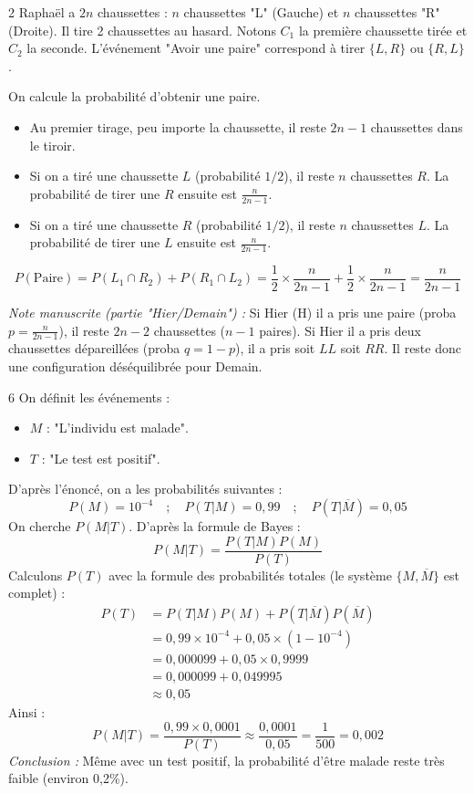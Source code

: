\begin{correction}{2}
Raphaël a $2n$ chaussettes : $n$ chaussettes "L" (Gauche) et $n$ chaussettes "R" (Droite).
Il tire 2 chaussettes au hasard.
Notons $C_1$ la première chaussette tirée et $C_2$ la seconde.
L'événement "Avoir une paire" correspond à tirer $\{L, R\}$ ou $\{R, L\}$.

On calcule la probabilité d'obtenir une paire.
\begin{itemize}
    \item Au premier tirage, peu importe la chaussette, il reste $2n-1$ chaussettes dans le tiroir.
    \item Si on a tiré une chaussette $L$ (probabilité $1/2$), il reste $n$ chaussettes $R$. La probabilité de tirer une $R$ ensuite est $\frac{n}{2n-1}$.
    \item Si on a tiré une chaussette $R$ (probabilité $1/2$), il reste $n$ chaussettes $L$. La probabilité de tirer une $L$ ensuite est $\frac{n}{2n-1}$.
\end{itemize}
$$ P(\text{Paire}) = P(L_1 \cap R_2) + P(R_1 \cap L_2) = \frac{1}{2} \times \frac{n}{2n-1} + \frac{1}{2} \times \frac{n}{2n-1} = \frac{n}{2n-1} $$

\textit{Note manuscrite (partie "Hier/Demain") :}
Si Hier (H) il a pris une paire (proba $p = \frac{n}{2n-1}$), il reste $2n-2$ chaussettes ($n-1$ paires).
Si Hier il a pris deux chaussettes dépareillées (proba $q = 1-p$), il a pris soit $LL$ soit $RR$. Il reste donc une configuration déséquilibrée pour Demain.
\end{correction}

\begin{correction}{6}
On définit les événements :
\begin{itemize}
    \item $M$ : "L'individu est malade".
    \item $T$ : "Le test est positif".
\end{itemize}
D'après l'énoncé, on a les probabilités suivantes :
$$ P(M) = 10^{-4} \quad ; \quad P(T | M) = 0,99 \quad ; \quad P(T | \overline{M}) = 0,05 $$
On cherche $P(M | T)$. D'après la formule de Bayes :
$$ P(M | T) = \frac{P(T | M) P(M)}{P(T)} $$
Calculons $P(T)$ avec la formule des probabilités totales (le système $\{M, \overline{M}\}$ est complet) :
\begin{align*}
    P(T) &= P(T | M)P(M) + P(T | \overline{M})P(\overline{M}) \\
    &= 0,99 \times 10^{-4} + 0,05 \times (1 - 10^{-4}) \\
    &= 0,000099 + 0,05 \times 0,9999 \\
    &= 0,000099 + 0,049995 \\
    &\approx 0,05
\end{align*}
Ainsi :
$$ P(M | T) = \frac{0,99 \times 0,0001}{P(T)} \approx \frac{0,0001}{0,05} = \frac{1}{500} = 0,002 $$
\textit{Conclusion :} Même avec un test positif, la probabilité d'être malade reste très faible (environ 0,2\%).
\end{correction}

